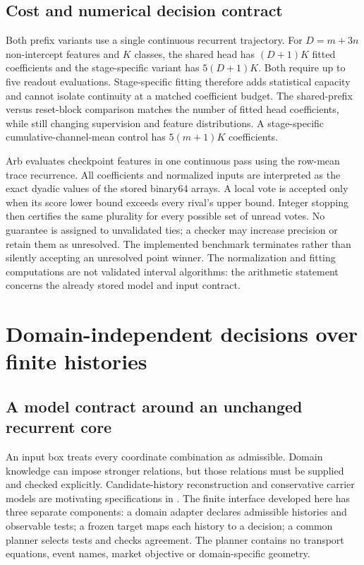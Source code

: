 \documentclass[11pt,a4paper]{article}
\theoremstyle{definition}\newtheorem{definition}[theorem]{Definition}
\begin{document}
\subsection{Cost and numerical decision contract}
Both prefix variants use a single continuous recurrent trajectory. For $D=m+3n$ non-intercept features and $K$ classes, the shared head has $(D+1)K$ fitted coefficients and the stage-specific variant has $5(D+1)K$. Both require up to five readout evaluations. Stage-specific fitting therefore adds statistical capacity and cannot isolate continuity at a matched coefficient budget. The shared-prefix versus reset-block comparison matches the number of fitted head coefficients, while still changing supervision and feature distributions. A stage-specific cumulative-channel-mean control has $5(m+1)K$ coefficients.

Arb evaluates checkpoint features in one continuous pass using the row-mean trace recurrence. All coefficients and normalized inputs are interpreted as the exact dyadic values of the stored binary64 arrays. A local vote is accepted only when its score lower bound exceeds every rival's upper bound. Integer stopping then certifies the same plurality for every possible set of unread votes. No guarantee is assigned to unvalidated ties; a checker may increase precision or retain them as unresolved. The implemented benchmark terminates rather than silently accepting an unresolved point winner. The normalization and fitting computations are not validated interval algorithms: the arithmetic statement concerns the already stored model and input contract.

\section{Domain-independent decisions over finite histories}\label{sec:finite}
\subsection{A model contract around an unchanged recurrent core}
An input box treats every coordinate combination as admissible. Domain knowledge can impose stronger relations, but those relations must be supplied and checked explicitly. Candidate-history reconstruction and conservative carrier models are motivating specifications in \cite{klemmchr2026,klemmt4w2026}. The finite interface developed here has three separate components: a domain adapter declares admissible histories and observable tests; a frozen target maps each history to a decision; a common planner selects tests and checks agreement. The planner contains no transport equations, event names, market objective or domain-specific geometry.
\end{document}
